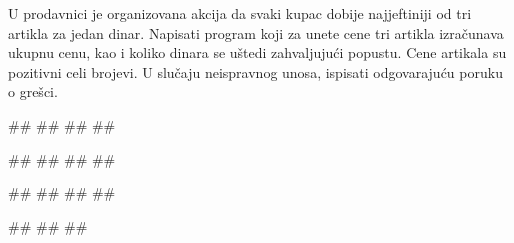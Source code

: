 \begin{Exercise}[label=KT_NG_05] 
U prodavnici je organizovana akcija da svaki kupac dobije najjeftiniji od tri artikla za jedan dinar. 
Napisati program koji za unete cene tri artikla izračunava ukupnu cenu, kao i koliko dinara se uštedi 
zahvaljujući popustu. Cene artikala su pozitivni celi brojevi. U slučaju neispravnog unosa, ispisati odgovarajuću poruku o grešci.

\begin{miditest}
\begin{upotreba}{1}
#\naslovInt#
##
##
##
\end{upotreba}
\end{miditest}
\begin{miditest}
\begin{upotreba}{2}
#\naslovInt#
##
##
##
\end{upotreba}
\end{miditest}

\begin{miditest}
\begin{upotreba}{3}
#\naslovInt#
##
##
##
\end{upotreba}
\end{miditest}
\begin{miditest}
\begin{upotreba}{4}
#\naslovInt#
##
##
\end{upotreba}
\end{miditest}

\end{Exercise}
\ifresenja
 \begin{Answer}[ref=KT_NG_05]
\end{Answer}
\fi



